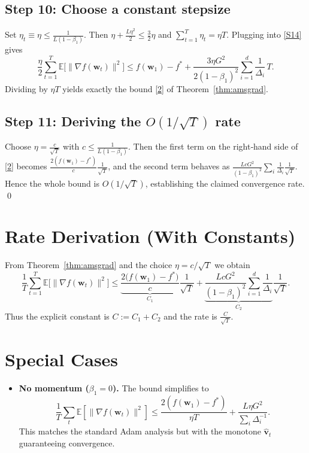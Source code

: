 \documentclass[11pt]{article}
\newcommand{\EE}{\mathbb{E}}
\begin{document}
{\subsection*{Step 10: Choose a constant stepsize}
Set $\eta_{t}\equiv\eta\le\frac{1}{L(1-\beta_{1})}$.
Then $\eta+\frac{L\eta^{2}}{2}\le\frac{3}{2}\eta$ and
$\sum_{t=1}^{T}\eta_{t}= \eta T$.
Plugging into \eqref{S14} gives
\[
\frac{\eta}{2}\sum_{t=1}^{T}
\EE\bigl[\|\nabla f(\mathbf{w}_{t})\|^{2}\bigr]
\le f(\mathbf{w}_{1})-f^{*}
+\frac{3\eta G^{2}}{2(1-\beta_{1})^{2}}
\sum_{i=1}^{d}\frac{1}{\Delta_{i}}\,T .
\]
Dividing by $\eta T$ yields exactly the bound \eqref{2} of
Theorem~\ref{thm:amsgrad}.

\subsection*{Step 11: Deriving the $O(1/\sqrt{T})$ rate}
Choose $\eta = \frac{c}{\sqrt{T}}$ with $c\le\frac{1}{L(1-\beta_{1})}$.
Then the first term on the right‑hand side of \eqref{2} becomes
$\frac{2(f(\mathbf{w}_{1})-f^{*})}{c}\frac{1}{\sqrt{T}}$,
and the second term behaves as
$\frac{LcG^{2}}{(1-\beta_{1})^{2}}\sum_{i}\frac{1}{\Delta_{i}}\frac{1}{\sqrt{T}}$.
Hence the whole bound is $O(1/\sqrt{T})$,
establishing the claimed convergence rate. \qed

\section{Rate Derivation (With Constants)}
\label{sec:rate}
From Theorem~\ref{thm:amsgrad} and the choice $\eta=c/\sqrt{T}$ we obtain
\[
\frac{1}{T}\sum_{t=1}^{T}\EE\bigl[\|\nabla f(\mathbf{w}_{t})\|^{2}\bigr]
\le
\underbrace{\frac{2\bigl(f(\mathbf{w}_{1})-f^{*}\bigr)}{c}}_{C_{1}}
\frac{1}{\sqrt{T}}
+
\underbrace{\frac{LcG^{2}}{(1-\beta_{1})^{2}}
\sum_{i=1}^{d}\frac{1}{\Delta_{i}}}_{C_{2}}
\frac{1}{\sqrt{T}} .
\]
Thus the explicit constant is $C:=C_{1}+C_{2}$ and the rate is
$\displaystyle \frac{C}{\sqrt{T}}$.

\section{Special Cases}
\label{sec:special}
\begin{itemize}
\item \textbf{No momentum ($\beta_{1}=0$).}
The bound simplifies to
\[
\frac{1}{T}\sum_{t}\EE[\|\nabla f(\mathbf{w}_{t})\|^{2}]
\le
\frac{2(f(\mathbf{w}_{1})-f^{*})}{\eta T}
+\frac{L\eta G^{2}}{ \sum_{i}\Delta_{i}^{-1}}.
\]
This matches the standard Adam analysis but with the monotone
$\hat{\mathbf{v}}_{t}$ guaranteeing convergence.


\end{itemize}}
\end{document}
